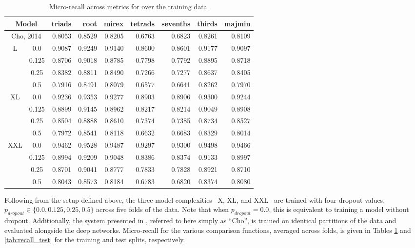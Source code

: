\begin{table}[t]
\scriptsize
\begin{center}
\caption{Micro-recall across metrics for over the training data.}
\label{tab:recall_train}
\begin{tabular}{cc|rrrrrrr}

\hline
 \multicolumn{2}{c|}{Model} &   triads &   root &  mirex &   tetrads &   sevenths &   thirds &   majmin \\
\hline
\hline
\multicolumn{2}{c|}{Cho, 2014} &   0.8053 & 0.8529 &  0.8205 &    0.6763 &     0.6823 &   0.8261 &   0.8109 \\
\hline
 L &  0.0 & 0.9087 & 0.9249 &  0.9140 & 0.8600 & 0.8601 &   0.9177 &   0.9097 \\
 & 0.125 &   0.8706 & 0.9018 &  0.8785 &    0.7798 &     0.7792 &   0.8895 &   0.8718 \\
 &  0.25 &   0.8382 & 0.8811 &  0.8490 &    0.7266 &     0.7277 &   0.8637 &   0.8405 \\
 & 0.5 &   0.7916 & 0.8491 &  0.8079 &    0.6577 &     0.6641 &   0.8262 &   0.7970 \\
\hline
  XL &   0.0 &   0.9236 & 0.9353 &  0.9277 &    0.8903 &     0.8906 &   0.9300 &   0.9244 \\
   &  0.125 &   0.8899 & 0.9145 &  0.8962 &    0.8217 &     0.8214 &   0.9049 &   0.8908 \\
   &  0.25 &   0.8504 & 0.8888 &  0.8610 &    0.7374 &     0.7385 &   0.8734 &   0.8527 \\
   &  0.5 &   0.7972 & 0.8541 &  0.8118 &    0.6632 &     0.6683 &   0.8329 &   0.8014 \\
\hline
  XXL &  0.0 &   0.9462 & 0.9528 & 0.9487 &    0.9297 &     0.9300 &   0.9498 &   0.9466 \\
   &   0.125 &   0.8994 & 0.9209 &  0.9048 &    0.8386 &     0.8374 &   0.9133 &   0.8997 \\
   &   0.25 &   0.8701 & 0.9041 & 0.8777 &    0.7833 &     0.7828 &   0.8921 &   0.8710 \\
   &   0.5 &   0.8043 & 0.8573 &  0.8184 &    0.6783 &     0.6820 &   0.8374 &   0.8080 \\
\hline
\end{tabular}
\end{center}
\end{table}

Following from the setup defined above, the three model complexities --X, XL, and XXL-- are trained with four dropout values, $p_{dropout} \in \{0.0, 0.125, 0.25, 0.5\}$ across five folds of the data.
Note that when $p_{dropout} = 0.0$, this is equivalent to training a model without dropout.
Additionally, the system presented in \cite{Cho2014PhD}, referred to here simply as ``Cho'', is trained on identical partitions of the data and evaluated alongside the deep networks.
Micro-recall for the various comparison functions, averaged across folds, is given in Tables \ref{tab:recall_train} and \ref{tab:recall_test} for the training and test splits, respectively.


